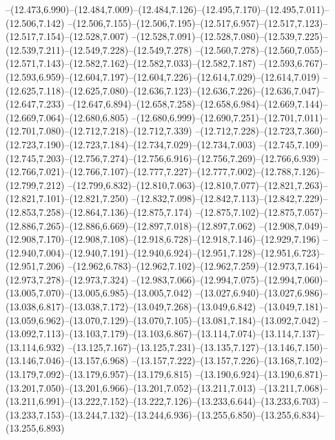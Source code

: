   --(12.473,6.990)--(12.484,7.009)--(12.484,7.126)--(12.495,7.170)--(12.495,7.011)--(12.506,7.142)%
  --(12.506,7.155)--(12.506,7.195)--(12.517,6.957)--(12.517,7.123)--(12.517,7.154)--(12.528,7.007)%
  --(12.528,7.091)--(12.528,7.080)--(12.539,7.225)--(12.539,7.211)--(12.549,7.228)--(12.549,7.278)%
  --(12.560,7.278)--(12.560,7.055)--(12.571,7.143)--(12.582,7.162)--(12.582,7.033)--(12.582,7.187)%
  --(12.593,6.767)--(12.593,6.959)--(12.604,7.197)--(12.604,7.226)--(12.614,7.029)--(12.614,7.019)%
  --(12.625,7.118)--(12.625,7.080)--(12.636,7.123)--(12.636,7.226)--(12.636,7.047)--(12.647,7.233)%
  --(12.647,6.894)--(12.658,7.258)--(12.658,6.984)--(12.669,7.144)--(12.669,7.064)--(12.680,6.805)%
  --(12.680,6.999)--(12.690,7.251)--(12.701,7.011)--(12.701,7.080)--(12.712,7.218)--(12.712,7.339)%
  --(12.712,7.228)--(12.723,7.360)--(12.723,7.190)--(12.723,7.184)--(12.734,7.029)--(12.734,7.003)%
  --(12.745,7.109)--(12.745,7.203)--(12.756,7.274)--(12.756,6.916)--(12.756,7.269)--(12.766,6.939)%
  --(12.766,7.021)--(12.766,7.107)--(12.777,7.227)--(12.777,7.002)--(12.788,7.126)--(12.799,7.212)%
  --(12.799,6.832)--(12.810,7.063)--(12.810,7.077)--(12.821,7.263)--(12.821,7.101)--(12.821,7.250)%
  --(12.832,7.098)--(12.842,7.113)--(12.842,7.229)--(12.853,7.258)--(12.864,7.136)--(12.875,7.174)%
  --(12.875,7.102)--(12.875,7.057)--(12.886,7.265)--(12.886,6.669)--(12.897,7.018)--(12.897,7.062)%
  --(12.908,7.049)--(12.908,7.170)--(12.908,7.108)--(12.918,6.728)--(12.918,7.146)--(12.929,7.196)%
  --(12.940,7.004)--(12.940,7.191)--(12.940,6.924)--(12.951,7.128)--(12.951,6.723)--(12.951,7.206)%
  --(12.962,6.783)--(12.962,7.102)--(12.962,7.259)--(12.973,7.164)--(12.973,7.278)--(12.973,7.324)%
  --(12.983,7.066)--(12.994,7.075)--(12.994,7.060)--(13.005,7.070)--(13.005,6.985)--(13.005,7.042)%
  --(13.027,6.940)--(13.027,6.986)--(13.038,6.817)--(13.038,7.172)--(13.049,7.268)--(13.049,6.842)%
  --(13.049,7.181)--(13.059,6.962)--(13.070,7.129)--(13.070,7.105)--(13.081,7.184)--(13.092,7.042)%
  --(13.092,7.113)--(13.103,7.179)--(13.103,6.867)--(13.114,7.074)--(13.114,7.137)--(13.114,6.932)%
  --(13.125,7.167)--(13.125,7.231)--(13.135,7.127)--(13.146,7.150)--(13.146,7.046)--(13.157,6.968)%
  --(13.157,7.222)--(13.157,7.226)--(13.168,7.102)--(13.179,7.092)--(13.179,6.957)--(13.179,6.815)%
  --(13.190,6.924)--(13.190,6.871)--(13.201,7.050)--(13.201,6.966)--(13.201,7.052)--(13.211,7.013)%
  --(13.211,7.068)--(13.211,6.991)--(13.222,7.152)--(13.222,7.126)--(13.233,6.644)--(13.233,6.703)%
  --(13.233,7.153)--(13.244,7.132)--(13.244,6.936)--(13.255,6.850)--(13.255,6.834)--(13.255,6.893)%
